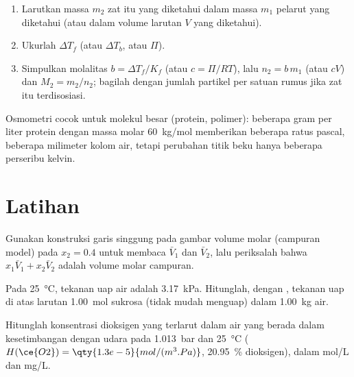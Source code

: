 \begin{method}\label{met:b2:chemical-potential:molar-mass}
\begin{enumerate}
  \item Larutkan massa $m_2$ zat itu yang diketahui dalam massa $m_1$
        pelarut yang diketahui (atau dalam volume larutan $V$ yang
        diketahui).
  \item Ukurlah $\Delta T_f$ (atau $\Delta T_b$, atau $\Pi$).
  \item Simpulkan molalitas $b = \Delta T_f/K_f$ (atau $c = \Pi/RT$), lalu
        $n_2 =
        b\,m_1$ (atau $cV$) dan $M_2 = m_2/n_2$; bagilah dengan
        jumlah partikel per satuan rumus jika zat itu terdisosiasi.
\end{enumerate}
Osmometri cocok untuk molekul besar (protein, polimer): beberapa gram per
liter protein dengan massa molar \qty{60}{kg/mol} memberikan beberapa ratus
pascal, beberapa milimeter kolom air, tetapi perubahan titik beku hanya
beberapa perseribu kelvin.
\end{method}

\section{Latihan}

\begin{exercise}[$\star$]\label{exo:b2:chemical-potential:1}
Gunakan konstruksi garis singgung pada gambar volume molar (campuran
model) pada $x_2 = 0.4$ untuk membaca $\bar V_1$ dan $\bar V_2$, lalu
periksalah bahwa $x_1\bar V_1 + x_2\bar V_2$ adalah volume molar campuran.
\end{exercise}

\begin{exercise}[$\star$]\label{exo:b2:chemical-potential:2}
Pada \qty{25}{\celsius}, tekanan uap air adalah \qty{3.17}{kPa}.
Hitunglah, dengan , tekanan uap di atas larutan \qty{1.00}{mol}
sukrosa (tidak mudah menguap) dalam \qty{1.00}{kg} air.
\end{exercise}

\begin{exercise}[$\star$]\label{exo:b2:chemical-potential:3}
Hitunglah konsentrasi dioksigen yang terlarut dalam air yang berada dalam
kesetimbangan dengan udara pada \qty{1.013}{bar} dan \qty{25}{\celsius}
($H(\ce{O2}) =
\qty{1.3e-5}{mol/(m^3.Pa)}$, \qty{20.95}{\percent}
dioksigen), dalam \unit{mol/L} dan \unit{mg/L}.
\end{exercise}


